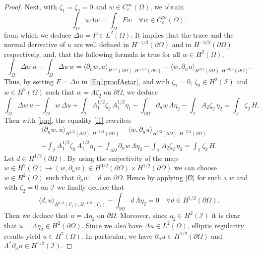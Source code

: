 \documentclass[10pt,a4paper]{amsart}
\begin{document}
\begin{proof}
Next, with $\zeta_1=\zeta_2=0$ and $w\in C^\infty_c(\Omega)$, we obtain
$$\int_\Omega u \Delta w=\int_\Omega F w\quad \forall w\in C^\infty_c(\Omega).$$ 
from which we deduce $\Delta u=F\in L^2(\Omega)$. It implies that the trace and the normal derivative of $u$ are well defined in $H^{-1/2}(\partial\Omega)$ and in $H^{-3/2}(\partial\Omega)$ respectively, and,  that the following formula is true for all $w \in H^2(\Omega)$,
\begin{equation}\label{ipp}
\int_\Omega\Delta w\,u-\int_\Omega \Delta u\,w=\langle\partial_n w,u\rangle_{H^{1/2}(\partial\Omega),H^{-1/2}(\partial\Omega)}-\langle w,\partial_n u\rangle_{H^{3/2}(\partial\Omega),H^{-3/2}(\partial\Omega)}.
\end{equation}
Thus, by setting $F=\Delta u$ in \eqref{Eq1proofAstar}, and with $\zeta_1=0$, $\zeta_2\in H^2(\mathcal{I})$ and $w\in H^2(\Omega)$ such that $w=\Lambda \zeta_2$ on $\partial\Omega$, we deduce
\begin{equation}\label{f1}
\int_\Omega\Delta w\,u-\int_\Omega w\,\Delta u+\int_{\mathcal{I}} A_1^{1/2} \zeta_2 \, A_1^{1/2}\eta_1-\int_{\partial\Omega}\partial_n w\,\Lambda \eta_2-\int_{\mathcal{I}}A_2\zeta_2\,\eta_2=\int_{\mathcal{I}}\zeta_2\,H.
\end{equation}
Then with \eqref{ipp}, the equality \eqref{f1} rewrites:
\begin{multline}\label{f2}
\langle\partial_n w,u\rangle_{H^{1/2}(\partial\Omega),H^{-1/2}(\partial\Omega)}-\langle w,\partial_n u\rangle_{H^{3/2}(\partial\Omega),H^{-3/2}(\partial\Omega)}\\+\int_{\mathcal{I}} A_1^{1/2} \zeta_2 \, A_1^{1/2}\eta_1-\int_{\partial\Omega}\partial_n w\,\Lambda \eta_2-\int_{\mathcal{I}}A_2\zeta_2\,\eta_2=\int_{\mathcal{I}}\zeta_2\,H.
\end{multline}
Let $d\in H^{1/2}(\partial\Omega)$. By using the surjectivity of the map $w\in H^2(\Omega)\mapsto (w,\partial_n w)\in H^{3/2}(\partial\Omega)\times H^{1/2}(\partial\Omega)$ we can choose $w\in H^2(\Omega)$ such that $\partial_n w=d$ on $\partial\Omega$. Hence by applying \eqref{f2} for such a $w$ and with $\zeta_2=0$ on $\mathcal{I}$ we finally deduce that
\begin{equation}\label{f3} 
\langle d,u\rangle_{H^{1/2}(\Gamma_1),H^{-1/2}(\Gamma_1)}-\int_{\partial\Omega}d \,\Lambda \eta_2=0 \quad \forall d\in H^{1/2}(\partial\Omega).
\end{equation}
Then we deduce that $u=\Lambda \eta_2$ on $\partial\Omega$. Moreover, since $\eta_2\in H^2(\mathcal{I})$ it is clear that $u=\Lambda \eta_2\in H^{2}(\partial\Omega)$. Since we also have $\Delta u\in L^2(\Omega)$, elliptic regularity results yield $u\in H^2(\Omega)$. In particular, we have $\partial_n u\in H^{1/2}(\partial\Omega)$ and $\Lambda^*\partial_n u\in H^{1/2}(\mathcal{I})$.


\end{proof}
\end{document}

